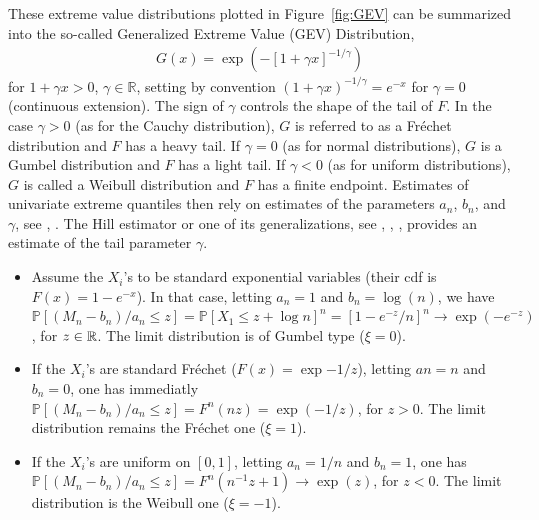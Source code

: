These extreme value distributions plotted in Figure~\ref{fig:GEV} can be summarized into the so-called Generalized Extreme Value (GEV) Distribution,
\begin{align}
\label{eq:GEV}
G(x) = \exp \left(-\left[1 + \gamma x\right]^{-1/\gamma}\right)
\end{align}
for $1 + \gamma x > 0$, $\gamma \in \mathbb{R}$,
setting by convention $(1 + \gamma x)^{-1/\gamma} = e^{-x}$ for
$\gamma = 0$ (continuous extension). %
The sign of $\gamma$ controls the shape of the tail of $F$.
 In the case $\gamma >0$ (as for the Cauchy distribution), $G$ is referred to as a Fréchet distribution and $F$ has a heavy tail. If $\gamma=0$ (as for normal distributions), $G$ is a Gumbel distribution and $F$ has a light tail. If $\gamma < 0$ (as for uniform distributions), $G$ is called a Weibull distribution and $F$ has a finite endpoint.
Estimates of univariate extreme quantiles then rely on estimates of the parameters $a_n$, $b_n$, and $\gamma$, see \cite{DEd1989}, \cite{ELL2009}. 
The Hill estimator or one of its generalizations, see \cite{Hill1975}, \cite{Smith1987}, \cite{BVT1996}, provides an estimate of the tail parameter $\gamma$. 
\begin{example}
\begin{itemize}
\item Assume the $X_i$'s to be standard exponential variables (their cdf is $F(x) = 1 - e^{-x}$). In that case, letting $a_n=1$ and $b_n = \log(n)$, we have
$\mathbb{P}[(M_n-b_n)/a_n \le z] = \mathbb{P}[X_1 \le z + \log n ]^n = [1 - e^{-z}/n]^n \to \exp(-e^{-z}) $, for $z \in \mathbb{R}$. The limit distribution is of Gumbel type ($\xi = 0$).
\item If the $X_i$'s are standard Fréchet ($F(x) = \exp{-1/z}$), letting $an = n$ and $b_n = 0$, one has immediatly $\mathbb{P}[(M_n-b_n)/a_n \le z] = F^n(nz) = \exp(-1/z)$, for $z >0$. The limit distribution remains the Fréchet one ($\xi = 1$).
\item If the $X_i$'s are uniform on $[0,1]$, letting $a_n = 1/n$ and $b_n = 1$, one has $\mathbb{P}[(M_n-b_n)/a_n \le z] = F^n(n^{-1}z + 1) \to \exp(z)$, for $z <0$. The limit distribution is the Weibull one ($\xi = -1$).

\end{itemize}
\end{example}

